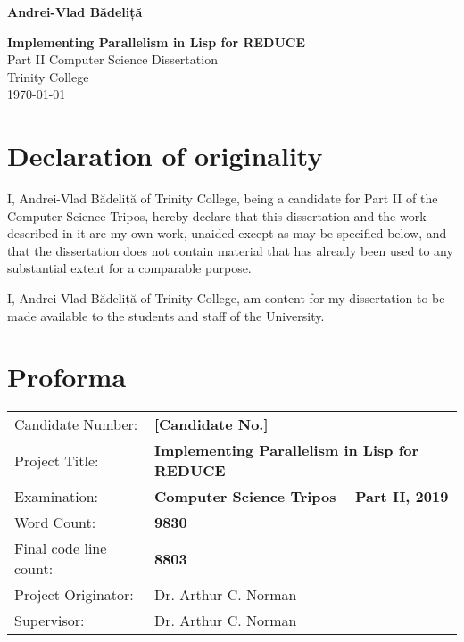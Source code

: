 \documentclass[a4paper,12pt,twoside,openright]{report}
\date{\today}
\title{}
\begin{document}

\hfill{\LARGE \bf Andrei-Vlad Bădeliță}

\pagestyle{empty}

\vspace*{60mm}
\begin{center}
\Huge{\bf Implementing Parallelism in Lisp for REDUCE} \\
\vspace*{5mm}
Part II Computer Science Dissertation \\
\vspace*{5mm}
Trinity College \\
\vspace*{5mm}
\today  %
\end{center}

\cleardoublepage


\pagestyle{plain}

\section*{Declaration of originality}

I, Andrei-Vlad Bădeliță of Trinity College, being a candidate for Part II of the
Computer Science Tripos, hereby declare that this dissertation and the work described
in it are my own work, unaided except as may be specified below, and that the
dissertation does not contain material that has already been used to any
substantial extent for a comparable purpose.

\medskip
\noindent
I, Andrei-Vlad Bădeliță of Trinity College, am content for my dissertation
to be made available to the students and staff of the University.

\bigskip
{}

\medskip
{}

\section*{Proforma}

{\large
\begin{tabular}{ll}
Candidate Number:   & \bf [Candidate No.] \\
Project Title:      & \bf Implementing Parallelism in Lisp for REDUCE \\
Examination:        & \bf Computer Science Tripos -- Part II, 2019  \\
Word Count:         & \bf 9830        \\
Final code line count: & \bf 8803        \\
Project Originator: & Dr. Arthur C. Norman                    \\
Supervisor:         & Dr. Arthur C. Norman                    \\
\end{tabular}
}
\end{document}
